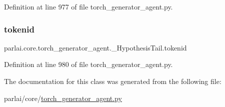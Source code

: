 Definition at line 977 of file torch\+\_\+generator\+\_\+agent.\+py.

\mbox{\label{classparlai_1_1core_1_1torch__generator__agent_1_1__HypothesisTail_a354a80abd13b7da3fd1d116c639a4f1a}} 
\subsubsection{\texorpdfstring{tokenid}{tokenid}}
{\footnotesize\ttfamily parlai.\+core.\+torch\+\_\+generator\+\_\+agent.\+\_\+\+Hypothesis\+Tail.\+tokenid}



Definition at line 980 of file torch\+\_\+generator\+\_\+agent.\+py.



The documentation for this class was generated from the following file\+:\begin{DoxyCompactItemize}
\item 
parlai/core/\hyperlink{torch__generator__agent_8py}{torch\+\_\+generator\+\_\+agent.\+py}\end{DoxyCompactItemize}
